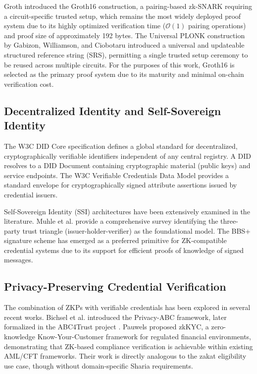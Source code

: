 \documentclass[conference]{IEEEtran}
\begin{document}
Groth \cite{groth2016} introduced the Groth16 construction, a pairing-based zk-SNARK requiring a circuit-specific trusted setup, which remains the most widely deployed proof system due to its highly optimized verification time ($\mathcal{O}(1)$ pairing operations) and proof size of approximately 192 bytes. The Universal PLONK construction by Gabizon, Williamson, and Ciobotaru \cite{gabizon2019} introduced a universal and updateable structured reference string (SRS), permitting a single trusted setup ceremony to be reused across multiple circuits. For the purposes of this work, Groth16 is selected as the primary proof system due to its maturity and minimal on-chain verification cost.

\subsection{Decentralized Identity and Self-Sovereign Identity}

The W3C DID Core specification \cite{sporny2022did} defines a global standard for decentralized, cryptographically verifiable identifiers independent of any central registry. A DID resolves to a DID Document containing cryptographic material (public keys) and service endpoints. The W3C Verifiable Credentials Data Model \cite{sporny2019vc} provides a standard envelope for cryptographically signed attribute assertions issued by credential issuers.

Self-Sovereign Identity (SSI) architectures have been extensively examined in the literature. Muhle et al. \cite{muhle2018} provide a comprehensive survey identifying the three-party trust triangle (issuer-holder-verifier) as the foundational model. The BBS+ signature scheme \cite{boneh2004} has emerged as a preferred primitive for ZK-compatible credential systems due to its support for efficient proofs of knowledge of signed messages.

\subsection{Privacy-Preserving Credential Verification}

The combination of ZKPs with verifiable credentials has been explored in several recent works. Bichsel et al. \cite{bichsel2010} introduced the Privacy-ABC framework, later formalized in the ABC4Trust project \cite{camenisch2012}. Pauwels \cite{pauwels2021} proposed zkKYC, a zero-knowledge Know-Your-Customer framework for regulated financial environments, demonstrating that ZK-based compliance verification is achievable within existing AML/CFT frameworks. Their work is directly analogous to the zakat eligibility use case, though without domain-specific Sharia requirements.
\end{document}

